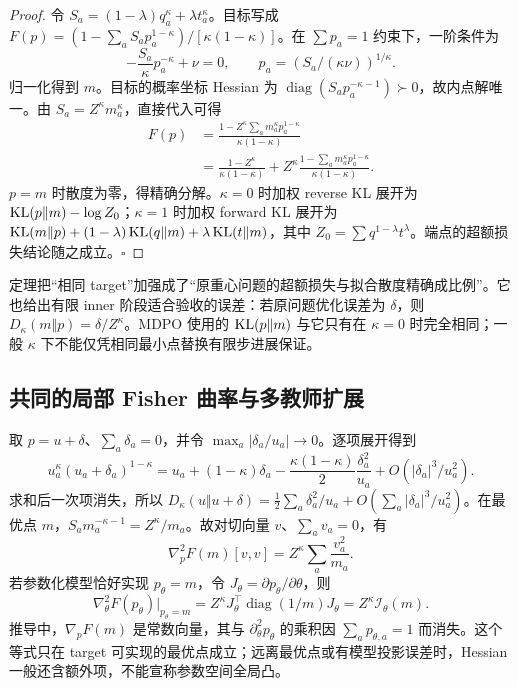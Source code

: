 \begin{proof}
令 $S_a=(1-\lambda)q_a^\kappa+\lambda t_a^\kappa$。目标写成 $F(p)=(1-\sum_aS_ap_a^{1-\kappa})/[\kappa(1-\kappa)]$。在 $\sum p_a=1$ 约束下，一阶条件为
\begin{equation}
 -\frac{S_a}{\kappa}p_a^{-\kappa}+\nu=0,
 \qquad p_a=(S_a/(\kappa\nu))^{1/\kappa}.
\end{equation}
归一化得到 $m$。目标的概率坐标 Hessian 为 $\operatorname{diag}(S_ap_a^{-\kappa-1})\succ0$，故内点解唯一。由 $S_a=Z^\kappa m_a^\kappa$，直接代入可得
\begin{align}
 F(p)
 &=\frac{1-Z^\kappa\sum_am_a^\kappa p_a^{1-\kappa}}{\kappa(1-\kappa)}\\
 &=\frac{1-Z^\kappa}{\kappa(1-\kappa)}
 +Z^\kappa\frac{1-\sum_am_a^\kappa p_a^{1-\kappa}}{\kappa(1-\kappa)}.
\end{align}
$p=m$ 时散度为零，得精确分解。$\kappa=0$ 时加权 reverse KL 展开为 $\operatorname{KL}(p\Vert m)-\log Z_0$；$\kappa=1$ 时加权 forward KL 展开为 $\operatorname{KL}(m\Vert p)+(1-\lambda)\operatorname{KL}(q\Vert m)+\lambda\operatorname{KL}(t\Vert m)$，其中 $Z_0=\sum q^{1-\lambda}t^\lambda$。端点的超额损失结论随之成立。\hfill$\square$
\end{proof}

定理把“相同 target”加强成了“原重心问题的超额损失与拟合散度精确成比例”。它也给出有限 inner 阶段适合验收的误差：若原问题优化误差为 $\delta$，则 $D_\kappa(m\Vert p)=\delta/Z^\kappa$。MDPO 使用的 $\operatorname{KL}(p\Vert m)$ 与它只有在 $\kappa=0$ 时完全相同；一般 $\kappa$ 下不能仅凭相同最小点替换有限步进展保证。

\subsection{共同的局部 Fisher 曲率与多教师扩展}

取 $p=u+\delta$、$\sum_a\delta_a=0$，并令 $\max_a|\delta_a/u_a|\to0$。逐项展开得到
\begin{equation}
 u_a^\kappa(u_a+\delta_a)^{1-\kappa}
 =u_a+(1-\kappa)\delta_a-\frac{\kappa(1-\kappa)}2\frac{\delta_a^2}{u_a}
 +O(|\delta_a|^3/u_a^2).
\end{equation}
求和后一次项消失，所以 $D_\kappa(u\Vert u+\delta)=\tfrac12\sum_a\delta_a^2/u_a+O(\sum_a|\delta_a|^3/u_a^2)$。在最优点 $m$，$S_am_a^{-\kappa-1}=Z^\kappa/m_a$。故对切向量 $v$、$\sum_av_a=0$，有
\begin{equation}
 \nabla_p^2F(m)[v,v]=Z^\kappa\sum_a\frac{v_a^2}{m_a}.
\end{equation}
若参数化模型恰好实现 $p_\theta=m$，令 $J_\theta=\partial p_\theta/\partial\theta$，则
\begin{equation}
 \nabla_\theta^2F(p_\theta)\big|_{p_\theta=m}
 =Z^\kappa J_\theta^\top\operatorname{diag}(1/m)J_\theta
 =Z^\kappa\mathcal I_\theta(m).
 \label{eq:proximal-fisher-hessian}
\end{equation}
推导中，$\nabla_pF(m)$ 是常数向量，其与 $\partial_\theta^2p_\theta$ 的乘积因 $\sum_ap_{\theta,a}=1$ 而消失。这个等式只在 target 可实现的最优点成立；远离最优点或有模型投影误差时，Hessian 一般还含额外项，不能宣称参数空间全局凸。

